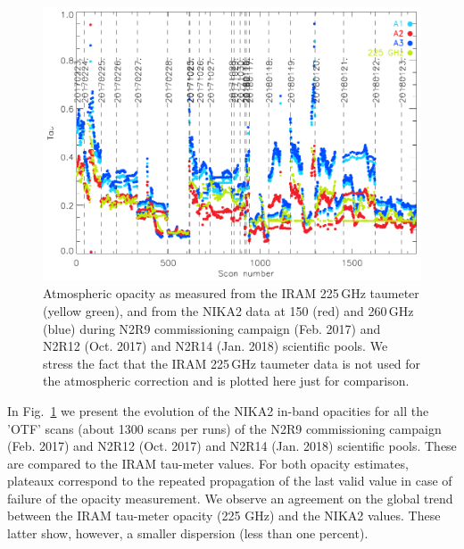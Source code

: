 \begin{figure}[ht]
\begin{center}
\includegraphics[scale=1.0]{Figures/opacity_evol_run_9_12_14.pdf}
\caption[Zenith opacity monitoring during N2R9, N2R12 and
  N2R14]{Atmospheric opacity as measured from the IRAM 225\,GHz
  taumeter (yellow green), and from the NIKA2 data at 150 (red) and
  260\,GHz (blue) during N2R9 commissioning campaign (Feb. 2017) and
  N2R12 (Oct. 2017) and N2R14 (Jan. 2018) scientific pools. We
  stress the fact that the IRAM 225\,GHz taumeter data is not used for
  the atmospheric correction and is plotted here just for comparison.
  \label{fig:taumeas}}
\end{center}
\end{figure}




In Fig.~\ref{fig:taumeas}  we present the evolution of the NIKA2 in-band
opacities for all the 'OTF' scans (about 1300 scans per runs) of the
N2R9 commissioning campaign (Feb. 2017) and N2R12 (Oct. 2017) and
N2R14 (Jan. 2018) scientific pools. These are compared to the IRAM
tau-meter values. For both opacity estimates, plateaux correspond to
the repeated propagation of the last valid value in case of failure of
the opacity measurement. We observe an agreement on the
global trend between the IRAM tau-meter opacity (225 GHz) and the
NIKA2 values. These latter show, however, a smaller dispersion (less
than one percent).




